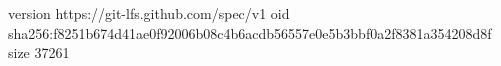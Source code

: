 version https://git-lfs.github.com/spec/v1
oid sha256:f8251b674d41ae0f92006b08c4b6acdb56557e0e5b3bbf0a2f8381a354208d8f
size 37261
